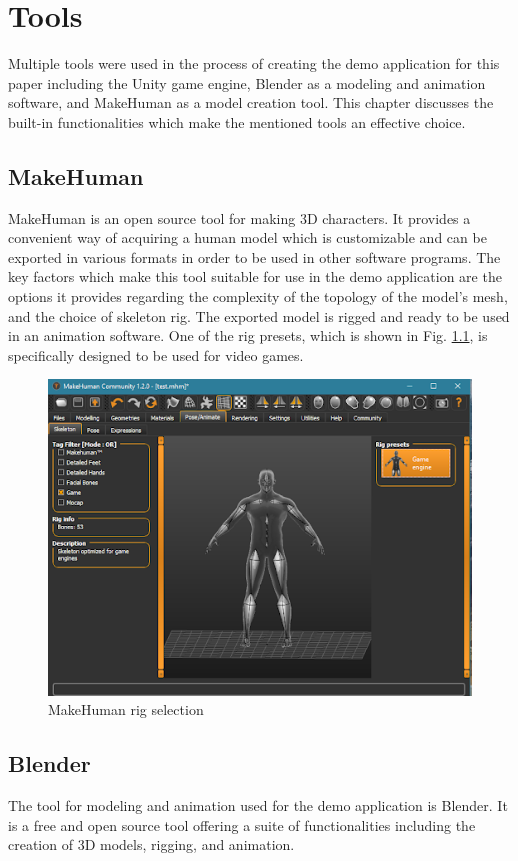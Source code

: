 \chapter{Tools} 
Multiple tools were used in the process of creating the demo application for
this paper including the Unity game engine, Blender as a modeling and animation
software, and MakeHuman as a model creation tool. This chapter discusses the
built-in functionalities which make the mentioned tools an effective choice.

\section{MakeHuman}
MakeHuman is an open source tool for making 3D characters. It provides
a convenient way of acquiring a human model which is customizable and can be
exported in various formats in order to be used in other software programs. The
key factors which make this tool suitable for use in the demo application are the
options it provides regarding the complexity of the topology of the model's
mesh, and the choice of skeleton rig. The exported model is rigged and ready to
be used in an animation software. One of the rig presets, which is shown in Fig.
\ref{fig:mh_rig}, is specifically designed to be used for video games.

\begin{figure}
    \centering
    \includegraphics[width=\textwidth]{grafika/make_human_rig.png}
    \caption{MakeHuman rig selection}
    \label{fig:mh_rig}
\end{figure}

\section{Blender}
The tool for modeling and animation used for the demo application is
Blender. It is a free and open source tool offering a suite of functionalities
including the creation of 3D models, rigging, and animation. 

